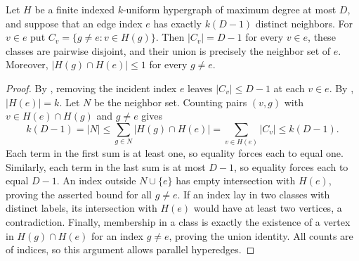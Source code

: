 \begin{lemma}
Let $H$ be a finite indexed $k$-uniform hypergraph of maximum degree at
most $D$, and suppose that an edge index $e$ has exactly $k(D-1)$ distinct
neighbors. For $v\in e$ put $C_v=\{g\ne e:v\in H(g)\}$.
Then $|C_v|=D-1$ for every $v\in e$, these classes are pairwise disjoint,
and their union is precisely the neighbor set of $e$. Moreover,
$|H(g)\cap H(e)|\leq1$ for every $g\ne e$.
\end{lemma}
\begin{proof}
By , removing the incident index $e$ leaves
$|C_v|\leq D-1$ at each $v\in e$. By ,
$|H(e)|=k$. Let $N$ be the neighbor set. Counting pairs $(v,g)$ with
$v\in H(e)\cap H(g)$ and $g\ne e$ gives
\[
k(D-1)=|N|\leq\sum_{g\in N}|H(g)\cap H(e)|
=\sum_{v\in H(e)}|C_v|\leq k(D-1).
\]
Each term in the first sum is at least one, so equality forces each to
equal one. Similarly, each term in the last sum is at most $D-1$, so
equality forces each to equal $D-1$. An index outside $N\cup\{e\}$
has empty intersection with $H(e)$, proving the asserted bound for all
$g\ne e$. If an index lay in two classes with distinct labels, its
intersection with $H(e)$ would have at least two vertices, a contradiction.
Finally, membership in a class is exactly the existence of a vertex in
$H(g)\cap H(e)$ for an index $g\ne e$, proving the union identity.
All counts are of indices, so this argument allows parallel hyperedges.
\end{proof}

